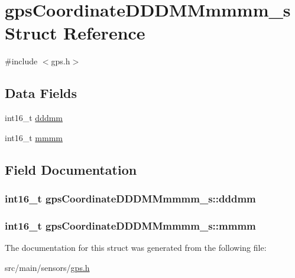 \hypertarget{structgpsCoordinateDDDMMmmmm__s}{\section{gps\+Coordinate\+D\+D\+D\+M\+Mmmmm\+\_\+s Struct Reference}
\label{structgpsCoordinateDDDMMmmmm__s}
}


{\ttfamily \#include $<$gps.\+h$>$}

\subsection*{Data Fields}
\begin{DoxyCompactItemize}
\item 
int16\+\_\+t \hyperlink{structgpsCoordinateDDDMMmmmm__s_a33d9cf02639fa0368f8c888fb3ffb02c}{dddmm}
\item 
int16\+\_\+t \hyperlink{structgpsCoordinateDDDMMmmmm__s_a72289cc4bf6e345978831ebe38897e7b}{mmmm}
\end{DoxyCompactItemize}


\subsection{Field Documentation}
\hypertarget{structgpsCoordinateDDDMMmmmm__s_a33d9cf02639fa0368f8c888fb3ffb02c}{
\subsubsection[{dddmm}]{\setlength{\rightskip}{0pt plus 5cm}int16\+\_\+t gps\+Coordinate\+D\+D\+D\+M\+Mmmmm\+\_\+s\+::dddmm}}\label{structgpsCoordinateDDDMMmmmm__s_a33d9cf02639fa0368f8c888fb3ffb02c}
\hypertarget{structgpsCoordinateDDDMMmmmm__s_a72289cc4bf6e345978831ebe38897e7b}{
\subsubsection[{mmmm}]{\setlength{\rightskip}{0pt plus 5cm}int16\+\_\+t gps\+Coordinate\+D\+D\+D\+M\+Mmmmm\+\_\+s\+::mmmm}}\label{structgpsCoordinateDDDMMmmmm__s_a72289cc4bf6e345978831ebe38897e7b}


The documentation for this struct was generated from the following file\+:\begin{DoxyCompactItemize}
\item 
src/main/sensors/\hyperlink{sensors_2gps_8h}{gps.\+h}\end{DoxyCompactItemize}
